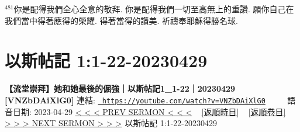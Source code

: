 \documentclass{book}
\begin{document}
$^{481}$你是配得我們全心全意的敬拜.
你是配得我們一切至高無上的重讚.
願你自己在我們當中得著應得的榮耀.
得著當得的讚美.
祈禱奉耶穌得勝名球.
\newpage



\section{以斯帖記 1:1-22-20230429}
\label{sec:VNZbDAiXlG0}
\textbf{【流堂崇拜】她和她最後的倔強｜以斯帖記1\_1-22｜20230429 [VNZbDAiXlG0]}
\newline
\newline
連結: \href{https://youtube.com/watch?v=VNZbDAiXlG0}{\texttt{ https://youtube.com/watch?v=VNZbDAiXlG0}} ~~~~ 語音日期: 2023-04-29 
\newline
\newline
\hyperref[sec:S0X_1Lh_dHA]{\small{< < < PREV SERMON < < <}}
~
\hyperref[sec:index_chronic]{\small{[返順時目]}}
~
\hyperref[sec:index_scriptual]{\small{[返順卷目]}}
~
\hyperref[sec:D8sOzznkhGg]{\small{> > > NEXT SERMON > > >}}
\newline
\newline
以斯帖記 1:1-22-20230429
\newline
\end{document}

